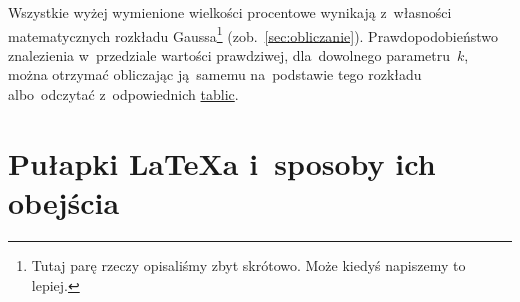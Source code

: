 \documentclass[a4paper,11pt]{article}
\begin{document}
\begin{enumerate}
  Wszystkie wyżej wymienione wielkości procentowe wynikają z~własności
  matematycznych rozkładu Gaussa\footnote{Tutaj parę rzeczy opisaliśmy
    zbyt skrótowo. Może kiedyś napiszemy to lepiej.}
  (zob.~\eqref{sec:obliczanie}). Prawdopodobieństwo znalezienia
  w~przedziale wartości prawdziwej, dla~dowolnego parametru~$k$, można
  otrzymać obliczając ją~samemu na~podstawie tego rozkładu
  albo~odczytać z~odpowiednich
  \href{https://en.wikipedia.org/wiki/Standard_normal_table}{tablic}.
\end{enumerate}





\section{Pułapki \LaTeX a i~sposoby ich obejścia}
\label{sec:pulapki}
\end{document}
